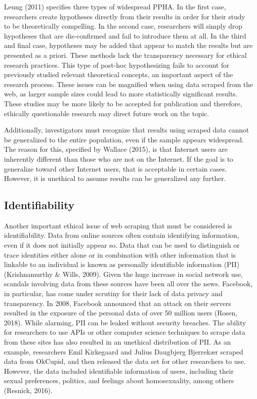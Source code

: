 \documentclass[12pt,twoside]{reedthesis}
\begin{document}
Leung (2011) specifies three types of widespread PPHA. In the first
case, researchers create hypotheses directly from their results in order
for their study to be theoretically compelling. In the second case,
researchers will simply drop hypotheses that are dis-confirmed and fail
to introduce them at all. In the third and final case, hypotheses may be
added that appear to match the results but are presented as a priori.
These methods lack the transparency necessary for ethical research
practices. This type of post-hoc hypothesizing fails to account for
previously studied relevant theoretical concepts, an important aspect of
the research process. These issues can be magnified when using data
scraped from the web, as larger sample sizes could lead to more
statistically significant results. These studies may be more likely to
be accepted for publication and therefore, ethically questionable
research may direct future work on the topic.

Additionally, investigators must recognize that results using scraped
data cannot be generalized to the entire population, even if the sample
appears widespread. The reason for this, specified by Wallace (2015), is
that Internet users are inherently different than those who are not on
the Internet. If the goal is to generalize toward other Internet users,
that is acceptable in certain cases. However, it is unethical to assume
results can be generalized any further.

\subsection{Identifiability}\label{identifiability}

Another important ethical issue of web scraping that must be considered
is identifiability. Data from online sources often contain identifying
information, even if it does not initially appear so. Data that can be
used to distinguish or trace identities either alone or in combination
with other information that is linkable to an individual is known as
personally identifiable information (PII) (Krishnamurthy \& Wills,
2009). Given the huge increase in social network use, scandals involving
data from these sources have been all over the news. Facebook, in
particular, has come under scrutiny for their lack of data privacy and
transparency. In 2008, Facebook announced that an attack on their
servers resulted in the exposure of the personal data of over 50 million
users (Rosen, 2018). While alarming, PII can be leaked without security
breaches. The ability for researchers to use APIs or other computer
science techniques to scrape data from these sites has also resulted in
an unethical distribution of PII. As an example, researchers Emil
Kirkegaard and Julius Daugbjerg Bjerrekær scraped data from OkCupid, and
then released the data set for other researchers to use. However, the
data included identifiable information of users, including their sexual
preferences, politics, and feelings about homosexuality, among others
(Resnick, 2016).
\end{document}
